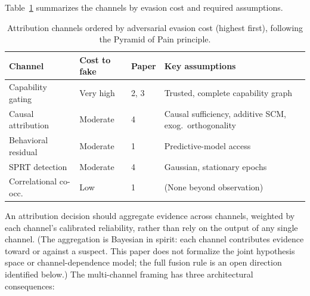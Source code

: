 Table~\ref{tab:channels} summarizes the channels by evasion cost and
required assumptions.

\begin{table}[h]
\centering
\small
\begin{tabular}{@{}lllp{3.8cm}@{}}
\toprule
\textbf{Channel} & \textbf{Cost to fake} & \textbf{Paper} & \textbf{Key assumptions} \\
\midrule
Capability gating  & Very high & 2, 3 & Trusted, complete capability graph \\
Causal attribution & Moderate  & 4    & Causal sufficiency, additive SCM, exog.\ orthogonality \\
Behavioral residual & Moderate & 1    & Predictive-model access \\
SPRT detection     & Moderate  & 4    & Gaussian, stationary epochs \\
Correlational co-occ. & Low   & 1    & (None beyond observation) \\
\bottomrule
\end{tabular}
\caption{Attribution channels ordered by adversarial evasion cost (highest first), following the Pyramid of Pain principle.}
\label{tab:channels}
\end{table}

An attribution decision should aggregate evidence across channels,
weighted by each channel's calibrated reliability, rather than rely
on the output of any single channel. (The aggregation is Bayesian in
spirit: each channel contributes evidence toward or against a
suspect. This paper does not formalize the joint hypothesis
space or channel-dependence model; the full fusion rule is an open
direction identified below.) The multi-channel framing has three
architectural consequences:

